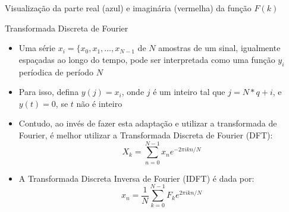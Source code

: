 \begin{frame}[fragile]{Visualização da parte real (azul) e imaginária (vermelha) da função $F(k)$}

    \begin{figure}
        \centering

    \end{figure}

\end{frame}

\begin{frame}[fragile]{Transformada Discreta de Fourier}

    \begin{itemize}
        \item Uma série $x_i = \{ x_0, x_1, \ldots, x_{N - 1}$ de $N$ amostras de um sinal,
            igualmente espaçadas ao longo do tempo,
            pode ser interpretada como uma função $y_i$ períodica de período $N$

        \item Para isso, defina $y(j) = x_i$, onde $j$ é um inteiro tal que $j = N*q + i$, e
            $y(t) = 0$, se $t$ não é inteiro

        \item Contudo, ao invés de fazer esta adaptação e utilizar a transformada de Fourier, é
            melhor utilizar a Transformada Discreta de Fourier (DFT):
        \[
            X_k = \sum_{n = 0}^{N - 1} x_ne^{-2\pi ikn/N}
        \]

        \item A Transformada Discreta Inversa de Fourier (IDFT) é dada por:
        \[
            x_n = \frac{1}{N}\sum_{k = 0}^{N - 1} F_ke^{2\pi ikn/N}
        \]

    \end{itemize}

\end{frame}


